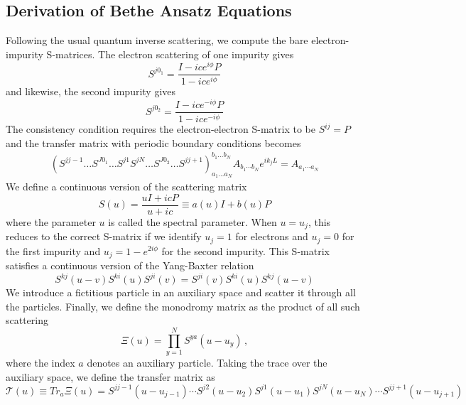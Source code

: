 \documentclass[aps,  prb,twocolumn,
  superscriptaddress,  floatfix,  10pt         
]{revtex4-2}
\begin{document}
\subsection*{Derivation of Bethe Ansatz Equations}
Following the usual quantum inverse scattering, we compute the bare electron-impurity S-matrices. The electron scattering of one impurity gives
\begin{equation}
    S^{j0_1}=\frac{I-ice^{i\phi}P}{1-ice^{i\phi}}
\end{equation}
and likewise, the second impurity gives
\begin{equation}
    S^{j0_2}=\frac{I-ice^{-i\phi}P}{1-ice^{-i\phi}}
\end{equation}
The consistency condition requires the electron-electron S-matrix to be 
$S^{ij}=P$ and the transfer matrix with periodic boundary conditions becomes
\begin{align}
\left(S^{j j-1} \ldots S^{J0_1}\ldots S^{j 1} S^{j N} \ldots S^{J0_2} \ldots S^{j j+1}\right)_{a_{1} \ldots a_{N}}^{b_{1} \ldots b_{N}}A_{b_1\cdots b_N} e^{i k_j L}= A_{a_1\cdots a_N}
\label{pbcc}
\end{align}
We define a continuous version of the scattering matrix
\begin{equation}
S(u)=\frac{u I+i c P}{u+i c} \equiv a(u) I+b(u) P
\end{equation} 
where the parameter $u$ is called the spectral parameter. When $u=u_j$, this reduces to the correct S-matrix if we identify $u_j=1$ for electrons and $u_j=0$ for the first impurity and $u_j=1-e^{2i\phi}$ for the second impurity. This S-matrix satisfies a continuous version of the Yang-Baxter relation
\begin{equation}
S^{k j}(u-v) S^{k i}(u) S^{j i}(v)=S^{j i}(v) S^{k i}(u) S^{k j}(u-v)
\label{contybe}
\end{equation}
We introduce a fictitious particle in an auxiliary space and scatter it through all the particles. Finally, we define the monodromy matrix as the product of all such scattering
\begin{equation}
\Xi(u)=\prod_{y=1}^N S^{ya}(u-u_y)\, ,
\end{equation}
where the index $a$ denotes an auxiliary particle.
Taking the trace over the auxiliary space, we define the transfer matrix as
\begin{equation}
\mathcal{T}(u)\equiv Tr_a{\Xi}(u)=S^{j j-1}(u-u_{j-1}) \cdots S^{j 2}(u-u_2) S^{j 1}(u-u_1) S^{j N}(u-u_N) \cdots S^{j j+1}(u-u_{j+1})
\label{transfermat}
\end{equation}
\end{document}
